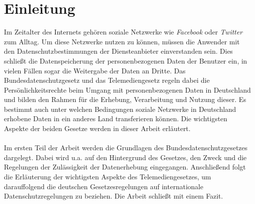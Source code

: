 \chapter{Einleitung}
Im Zeitalter des Internets gehören soziale Netzwerke wie \textit{Facebook} oder \textit{Twitter} zum Alltag. Um diese Netzwerke nutzen zu können, müssen die Anwender mit den Datenschutzbestimmungen der Diensteanbieter einverstanden sein. Dies schließt die Datenspeicherung der personenbezogenen Daten der Benutzer ein, in vielen Fällen sogar die Weitergabe der Daten an Dritte. Das Bundesdatenschutzgesetz und das Telemediengesetz regeln dabei die Persönlichkeitsrechte beim Umgang mit personenbezogenen Daten in Deutschland und bilden den Rahmen für die Erhebung, Verarbeitung und Nutzung dieser. Es bestimmt auch unter welchen Bedingungen soziale Netzwerke in Deutschland erhobene Daten in ein anderes Land transferieren können. Die wichtigsten Aspekte der beiden Gesetze werden in dieser Arbeit erläutert.\\
\\Im ersten Teil der Arbeit werden die Grundlagen des Bundesdatenschutzgesetzes dargelegt. Dabei wird u.a. auf den Hintergrund des Gesetzes, den Zweck und die Regelungen der Zulässigkeit der Datenerhebung eingegangen. Anschließend folgt die Erläuterung der wichtigsten Aspekte des Telemediengesetzes, um darauffolgend die deutschen Gesetzesregelungen auf internationale Datenschutzregelungen zu beziehen. Die Arbeit schließt mit einem Fazit.